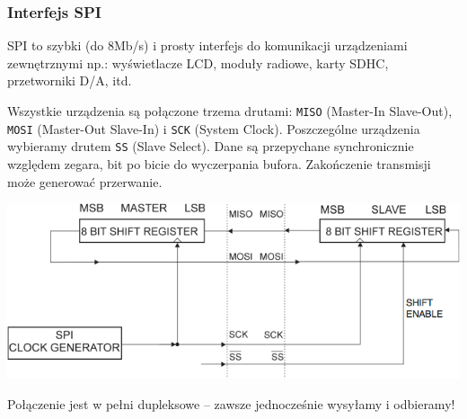 \documentclass[8pt]{beamer}
\begin{document}
\begin{frame}
  \frametitle{Interfejs SPI}

  SPI to szybki (do 8Mb/s) i prosty interfejs do komunikacji urządzeniami
  zewnętrznymi np.: wyświetlacze LCD, moduły radiowe, karty SDHC, przetworniki
  D/A, itd.

  \vspace{1em}

  Wszystkie urządzenia są połączone trzema drutami: \texttt{MISO} (Master-In
  Slave-Out), \texttt{MOSI} (Master-Out Slave-In) i \texttt{SCK} (System
  Clock). Poszczególne urządzenia wybieramy drutem \texttt{SS} (Slave Select).
  Dane są przepychane synchronicznie względem zegara, bit po bicie do
  wyczerpania bufora. Zakończenie transmisji może generować przerwanie.

  \begin{center}
    \includegraphics[scale=0.6666]{images/spi.png}
  \end{center}
 
  \begin{alertblock}{}
    Połączenie jest w pełni dupleksowe -- zawsze jednocześnie wysyłamy i
    odbieramy!
  \end{alertblock}

\end{frame}



\end{document}
